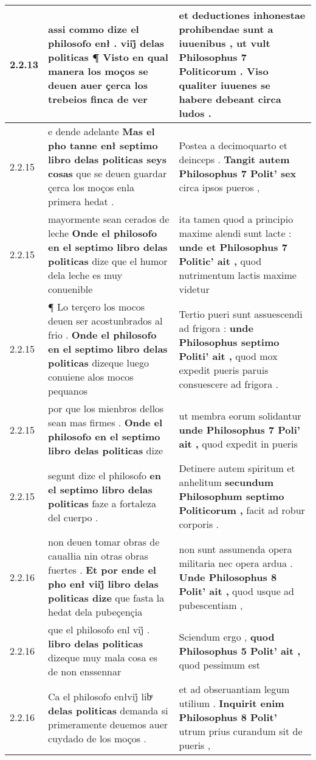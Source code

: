 \begin{tabular}{|p{1cm}|p{6.5cm}|p{6.5cm}|}
2.2.13 & assi commo dize el philosofo enł . viij̊ \textbf{ delas politicas ¶ } Visto en qual manera los moços se deuen auer çerca los trebeios finca de ver & et deductiones inhonestae prohibendae sunt a iuuenibus , \textbf{ ut vult Philosophus 7 Politicorum . } Viso qualiter iuuenes se habere debeant circa ludos . \\\hline
2.2.15 & e dende adelante \textbf{ Mas el pho tanne enł septimo libro delas politicas seys cosas } que se deuen guardar çerca los moços enla primera hedat . & Postea a decimoquarto et deinceps . \textbf{ Tangit autem Philosophus 7 Polit’ sex } circa ipsos pueros , \\\hline
2.2.15 & mayormente sean cerados de leche \textbf{ Onde el philosofo en el septimo libro delas politicas } dize que el humor dela leche es muy conuenible & ita tamen quod a principio maxime alendi sunt lacte : \textbf{ unde et Philosophus 7 Politic’ ait , } quod nutrimentum lactis maxime videtur \\\hline
2.2.15 & ¶ Lo terçero los mocos deuen ser acostunbrados al frio . \textbf{ Onde el philosofo en el septimo libro delas politicas } dizeque luego conuiene alos mocos pequanos & Tertio pueri sunt assuescendi ad frigora : \textbf{ unde Philosophus septimo Politi’ ait , } quod mox expedit pueris paruis consuescere ad frigora . \\\hline
2.2.15 & por que los mienbros dellos sean mas firmes . \textbf{ Onde el philosofo en el septimo libro delas politicas } dize & ut membra eorum solidantur \textbf{ unde Philosophus 7 Poli’ ait , } quod expedit in pueris \\\hline
2.2.15 & segunt dize el philosofo \textbf{ en el septimo libro delas politicas } faze a fortaleza del cuerpo . & Detinere autem spiritum et anhelitum \textbf{ secundum Philosophum septimo Politicorum , } facit ad robur corporis . \\\hline
2.2.16 & non deuen tomar obras de caualłia nin otras obras fuertes . \textbf{ Et por ende el pho enł viij̊ libro delas politicas dize } que fasta la hedat dela pubeçençia & non sunt assumenda opera militaria nec opera ardua . \textbf{ Unde Philosophus 8 Polit’ ait , } quod usque ad pubescentiam , \\\hline
2.2.16 & que el philosofo enl vij̊ . \textbf{ libro delas politicas } dizeque muy mala cosa es de non enssennar & Sciendum ergo , \textbf{ quod Philosophus 5 Polit’ ait , } quod pessimum est \\\hline
2.2.16 & Ca el philosofo enłvij̊ libͤ \textbf{ delas politicas } demanda si primeramente deuemos auer cuydado de los moços . & et ad obseruantiam legum utilium . \textbf{ Inquirit enim Philosophus 8 Polit’ } utrum prius curandum sit de pueris , \\\hline

\end{tabular}
